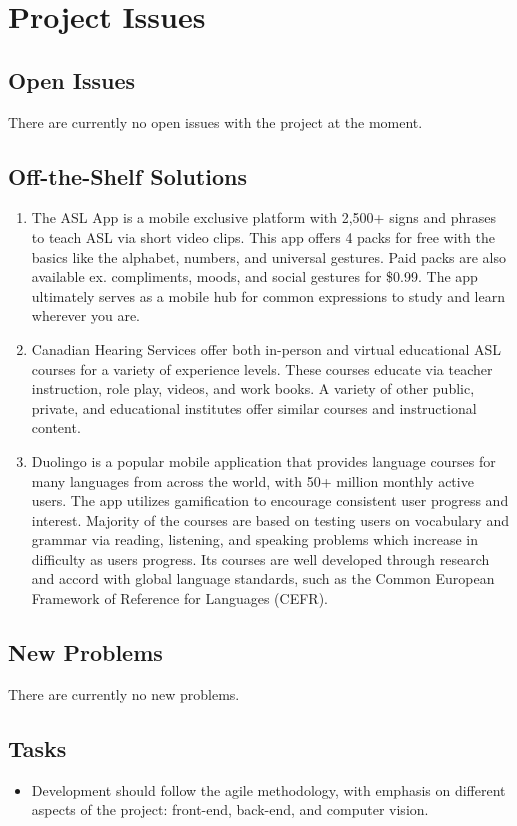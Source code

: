 \documentclass[12pt, titlepage]{article}
\begin{document}
\section{Project Issues}

\subsection{Open Issues}
There are currently no open issues with the project at the moment.

\subsection{Off-the-Shelf Solutions}
\begin{enumerate}
    \item The ASL App is a mobile exclusive platform with 2,500+ signs and phrases to teach ASL via short video clips. This app offers 4 packs for free with the basics like the alphabet, numbers, and universal gestures. Paid packs are also available ex. compliments, moods, and social gestures for \$0.99. The app ultimately serves as a mobile hub for common expressions to study and learn wherever you are.
    \item Canadian Hearing Services offer both in-person and virtual educational ASL courses for a variety of experience levels. These courses educate via teacher instruction, role play, videos, and work books. A variety of other public, private, and educational institutes offer similar courses and instructional content.
    \item Duolingo is a popular mobile application that provides language courses for many languages from across the world, with 50+ million monthly active users. The app utilizes gamification to encourage consistent user progress and interest. Majority of the courses are based on testing users on vocabulary and grammar via reading, listening, and speaking problems which increase in difficulty as users progress. Its courses are well developed through research and accord with global language standards, such as the Common European Framework of Reference for Languages (CEFR).
\end{enumerate}

\subsection{New Problems}
There are currently no new problems.

\subsection{Tasks}
\begin{itemize}
    \item Development should follow the agile methodology, with emphasis on different aspects of the project: front-end, back-end, and computer vision.
\end{itemize}
\end{document}
